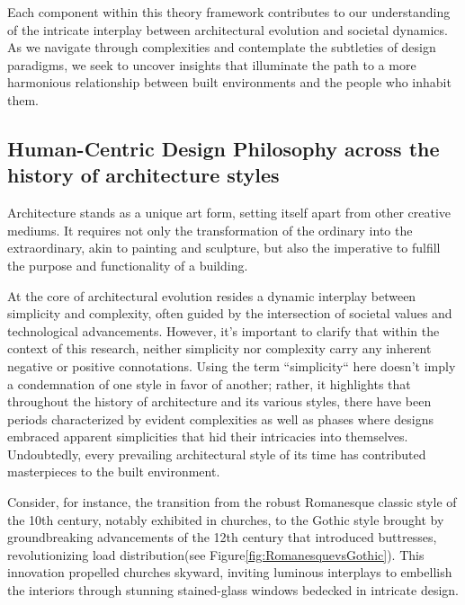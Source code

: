 Each component within this theory framework contributes to our understanding of the intricate interplay between architectural evolution and societal dynamics.
As we navigate through complexities and contemplate the subtleties of design paradigms, we seek to uncover insights that illuminate the path to a more harmonious relationship between built environments and the people who inhabit them.

\subsection{Human-Centric Design Philosophy across the history of architecture styles}
\label{subsec:TimelineArchitectureStyles}


Architecture stands as a unique art form, setting itself apart from other creative mediums.
It requires not only the transformation of the ordinary into the extraordinary, akin to painting and sculpture, but also the imperative to fulfill the purpose and functionality of a building\cite{Hnin2022}.

At the core of architectural evolution resides a dynamic interplay between simplicity and complexity, often guided by the intersection of societal values and technological advancements\cite{Economakis2023}.
However, it's important to clarify that within the context of this research, neither simplicity nor complexity carry any inherent negative or positive connotations.
Using the term ``simplicity`` here doesn't imply a condemnation of one style in favor of another;
rather, it highlights that throughout the history of architecture and its various styles, there have been periods characterized by evident complexities as well as phases where designs embraced apparent simplicities that hid their intricacies into themselves.
Undoubtedly, every prevailing architectural style of its time has contributed masterpieces to the built environment.

Consider, for instance, the transition from the robust Romanesque classic style of the 10th century, notably exhibited in churches, to the Gothic style brought by groundbreaking advancements of the 12th century that introduced buttresses, revolutionizing load distribution\cite{Arora2023}(see Figure\ref{fig:RomanesquevsGothic}).
This innovation propelled churches skyward, inviting luminous interplays to embellish the interiors through stunning stained-glass windows bedecked in intricate design\cite{Stacbond2020}.

